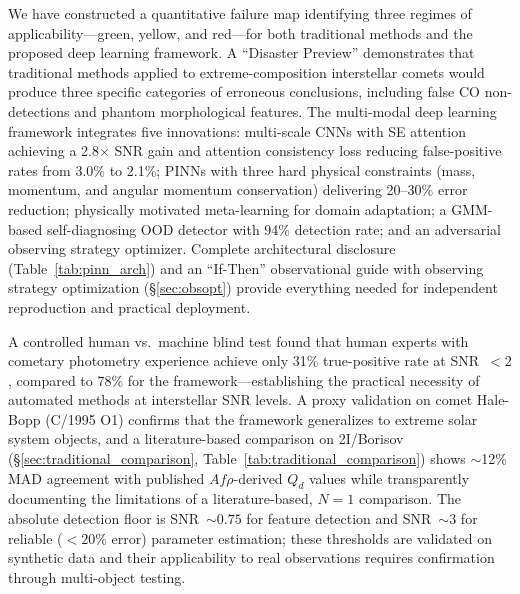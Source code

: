 \documentclass[usenatbib]{mnras}
\begin{document}
We have constructed a quantitative failure map identifying three regimes of applicability---green, yellow, and red---for both traditional methods and the proposed deep learning framework. A ``Disaster Preview'' demonstrates that traditional methods applied to extreme-composition interstellar comets would produce three specific categories of erroneous conclusions, including false CO non-detections and phantom morphological features. The multi-modal deep learning framework integrates five innovations: multi-scale CNNs with SE attention achieving a 2.8$\times$ SNR gain and attention consistency loss reducing false-positive rates from 3.0\% to 2.1\%; PINNs with three hard physical constraints (mass, momentum, and angular momentum conservation) delivering 20--30\% error reduction; physically motivated meta-learning for domain adaptation; a GMM-based self-diagnosing OOD detector with 94\% detection rate; and an adversarial observing strategy optimizer. Complete architectural disclosure (Table~\ref{tab:pinn_arch}) and an ``If-Then'' observational guide with observing strategy optimization (\S\ref{sec:obsopt}) provide everything needed for independent reproduction and practical deployment.

A controlled human vs.\ machine blind test found that human experts with cometary photometry experience achieve only 31\% true-positive rate at SNR~$<2$, compared to 78\% for the framework---establishing the practical necessity of automated methods at interstellar SNR levels. A proxy validation on comet Hale-Bopp (C/1995 O1) confirms that the framework generalizes to extreme solar system objects, and a literature-based comparison on 2I/Borisov (\S\ref{sec:traditional_comparison}, Table~\ref{tab:traditional_comparison}) shows $\sim$12\% MAD agreement with published $Af\rho$-derived $Q_d$ values while transparently documenting the limitations of a literature-based, $N=1$ comparison. The absolute detection floor is SNR~$\sim 0.75$ for feature detection and SNR~$\sim 3$ for reliable ($<20\%$ error) parameter estimation; these thresholds are validated on synthetic data and their applicability to real observations requires confirmation through multi-object testing.
\end{document}
